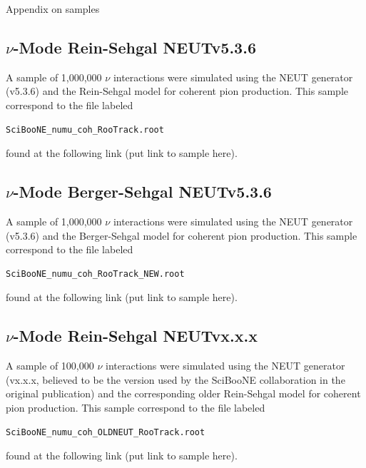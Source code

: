 \documentclass[11pt]{article}
\begin{document}
Appendix on samples

\subsection{$\nu$-Mode Rein-Sehgal NEUTv5.3.6}
A sample of 1,000,000 $\nu$ interactions were simulated using the NEUT generator (v5.3.6) and the Rein-Sehgal model for coherent pion production. This sample correspond to the file labeled 
\begin{verbatim}
SciBooNE_numu_coh_RooTrack.root
\end{verbatim}
found at the following link (put link to sample here).

\subsection{$\nu$-Mode Berger-Sehgal NEUTv5.3.6}
A sample of 1,000,000 $\nu$ interactions were simulated using the NEUT generator (v5.3.6) and the Berger-Sehgal model for coherent pion production. This sample correspond to the file labeled
\begin{verbatim}
SciBooNE_numu_coh_RooTrack_NEW.root
\end{verbatim}
found at the following link (put link to sample here).



\subsection{$\nu$-Mode Rein-Sehgal NEUTvx.x.x}
A sample of 100,000 $\nu$ interactions were simulated using the NEUT generator (vx.x.x, believed to be the version used by the SciBooNE collaboration in the original publication) and the corresponding older Rein-Sehgal model for coherent pion production. This sample correspond to the file labeled
\begin{verbatim}
SciBooNE_numu_coh_OLDNEUT_RooTrack.root
\end{verbatim}
found at the following link (put link to sample here).


\end{document}
